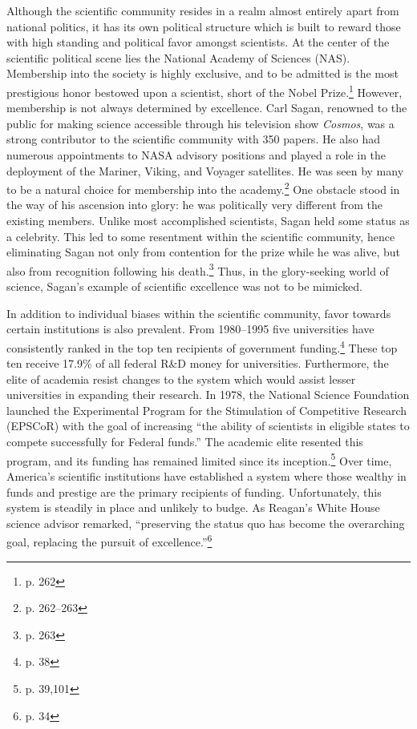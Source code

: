 \documentclass{article}[12pt]
\begin{document}
Although the scientific community resides in a realm almost entirely apart from
national politics, it has its own political structure which is built to reward
those with high standing and political favor amongst scientists. At the center
of the scientific political scene lies the National Academy of Sciences (NAS).
Membership into the society is highly exclusive, and to be admitted is the most
prestigious honor bestowed upon a scientist, short of the Nobel
Prize.\footnote{p. 262} However, membership is not always determined by
excellence. Carl Sagan, renowned to the public for making science accessible
through his television show \emph{Cosmos}, was a strong contributor to the
scientific community with 350 papers.  He also had numerous appointments to
NASA advisory positions and played a role in the deployment of the Mariner,
Viking, and Voyager satellites. He was seen by many to be a natural choice for
membership into the academy.\footnote{p. 262--263} One obstacle stood in the way
of his ascension into glory: he was politically very different from the
existing members. Unlike most accomplished scientists, Sagan held some status
as a celebrity. This led to some resentment within the scientific community,
hence eliminating Sagan not only from contention for the prize while he was
alive, but also from recognition following his death.\footnote{p. 263} Thus, in
the glory-seeking world of science, Sagan's example of scientific excellence
was not to be mimicked.

In addition to individual biases within the scientific community, favor
towards certain institutions is also prevalent.  From 1980--1995 five
universities have consistently ranked in the top ten recipients of government
funding.\footnote{p. 38}  These top ten receive 17.9\% of all federal R\&D money
for universities. Furthermore, the elite of academia resist changes to the
system which would assist lesser universities in expanding their research. In
1978, the National Science Foundation launched the Experimental Program for the
Stimulation of Competitive Research (EPSCoR) with the goal of increasing ``the
ability of scientists in eligible states to compete successfully for Federal
funds.'' The academic elite resented this program, and its funding has remained
limited since its inception.\footnote{p. 39,101}  Over time, America's scientific
institutions have established a system where those wealthy in funds and
prestige are the primary recipients of funding.  Unfortunately, this system is
steadily in place and unlikely to budge. As Reagan's White House science
advisor remarked, ``preserving the status quo has become the overarching goal,
replacing the pursuit of excellence.''\footnote{p. 34}
\end{document}
